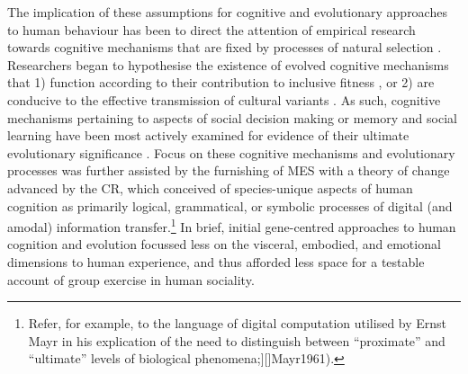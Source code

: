 \begin{CJK}{UTF8}{gbsn}
The implication of these assumptions for cognitive and evolutionary approaches to human behaviour has been to direct the attention of empirical research towards cognitive mechanisms that are fixed by processes of natural selection \citep{Lickliter2003,Kenrick2001}.  Researchers began to hypothesise the existence of evolved cognitive mechanisms that 1) function according to their contribution to inclusive fitness \citep[an approach that has since matured into the field of evolutionary psychology][]{Cosmides1992}, or 2) are conducive to the effective \citep[i.e. ``cumulative'' see][]{Tomasello1993} transmission of cultural variants \citep[an approach that has since matured into the field of cultural evolution][]{Cavalli-Sforza1981,Boyd1988}.  As such, cognitive mechanisms pertaining to aspects of social decision making \citep[in the case of game-theoretical models of cooperation, see][]{Cosmides1989,West2011} or memory and social learning \citep[in the case of gene-culture coevolutionary models][]{Henrich2003} have been most actively examined for evidence of their ultimate evolutionary significance \citep{Badcock2012}.  Focus on these cognitive mechanisms and evolutionary processes was further assisted by the furnishing of MES with a theory of change advanced by the CR, which conceived of species-unique aspects of human cognition as primarily logical, grammatical, or symbolic processes of digital (and amodal) information transfer.\footnote{Refer, for example, to the language of digital computation utilised by Ernst Mayr in his explication of the need to distinguish between ``proximate'' and ``ultimate'' levels of biological phenomena;][]{Mayr1961}).}  In brief, initial gene-centred approaches to human cognition and evolution focussed less on the visceral, embodied, and emotional dimensions to human experience, and thus afforded less space for a testable account of group exercise in human sociality.



\end{CJK}
